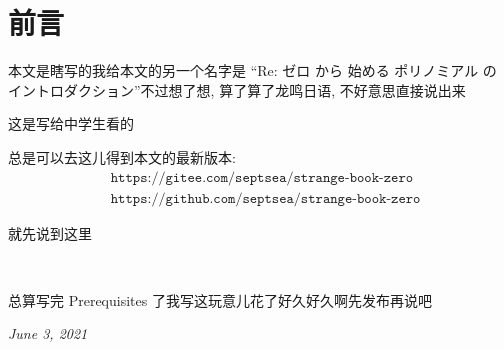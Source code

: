 \section*{前言}

本文是瞎写的\period 我给本文的另一个名字是 ``Re: ゼロ から 始める ポリノミアル の イントロダクション''\period 不过想了想, 算了算了\period 龙鸣日语, 不好意思直接说出来\period

这是写给中学生看的\period

总是可以去这儿得到本文的最新版本:
\begin{align*}
    & \texttt{https://gitee.com/septsea/strange-book-zero} \\
    & \texttt{https://github.com/septsea/strange-book-zero}
\end{align*}

就先说到这里\period

\ \

\newcommand{\appendDate}[1]{\par \hfill {\itshape \sffamily #1}}

\begin{remark}
    总算写完 Prerequisites 了\period 我写这玩意儿花了好久好久啊\period 先发布再说吧\period
    \appendDate{June 3, 2021}
\end{remark}

